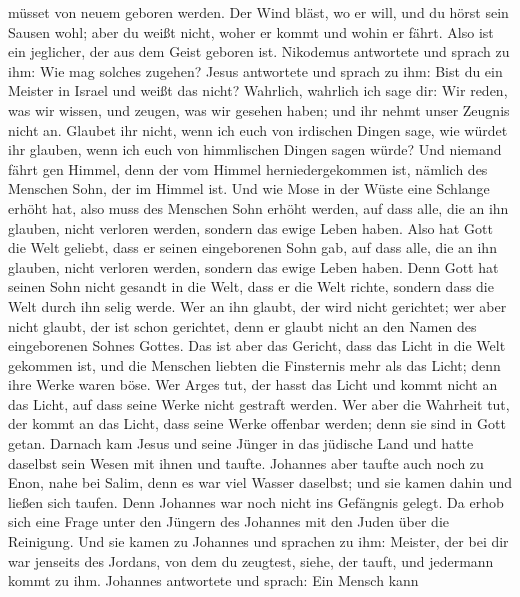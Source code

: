 müsset von neuem geboren werden.  Der Wind bläst, wo er
will, und du hörst sein Sausen wohl; aber du weißt nicht, woher er kommt
und wohin er fährt. Also ist ein jeglicher, der aus dem Geist geboren
ist.  Nikodemus antwortete und sprach zu ihm: Wie mag
solches zugehen?  Jesus antwortete und sprach zu ihm: Bist
du ein Meister in Israel und weißt das nicht?  Wahrlich,
wahrlich ich sage dir: Wir reden, was wir wissen, und zeugen, was wir
gesehen haben; und ihr nehmt unser Zeugnis nicht an. 
Glaubet ihr nicht, wenn ich euch von irdischen Dingen sage, wie würdet
ihr glauben, wenn ich euch von himmlischen Dingen sagen würde?
 Und niemand fährt gen Himmel, denn der vom Himmel
herniedergekommen ist, nämlich des Menschen Sohn, der im Himmel ist.
 Und wie Mose in der Wüste eine Schlange erhöht hat, also
muss des Menschen Sohn erhöht werden,  auf dass alle, die
an ihn glauben, nicht verloren werden, sondern das ewige Leben haben.
 Also hat Gott die Welt geliebt, dass er seinen
eingeborenen Sohn gab, auf dass alle, die an ihn glauben, nicht verloren
werden, sondern das ewige Leben haben.  Denn Gott hat
seinen Sohn nicht gesandt in die Welt, dass er die Welt richte, sondern
dass die Welt durch ihn selig werde.  Wer an ihn glaubt,
der wird nicht gerichtet; wer aber nicht glaubt, der ist schon
gerichtet, denn er glaubt nicht an den Namen des eingeborenen Sohnes
Gottes.  Das ist aber das Gericht, dass das Licht in die
Welt gekommen ist, und die Menschen liebten die Finsternis mehr als das
Licht; denn ihre Werke waren böse.  Wer Arges tut, der
hasst das Licht und kommt nicht an das Licht, auf dass seine Werke nicht
gestraft werden.  Wer aber die Wahrheit tut, der kommt an
das Licht, dass seine Werke offenbar werden; denn sie sind in Gott
getan.  Darnach kam Jesus und seine Jünger in das jüdische
Land und hatte daselbst sein Wesen mit ihnen und taufte. 
Johannes aber taufte auch noch zu Enon, nahe bei Salim, denn es war viel
Wasser daselbst; und sie kamen dahin und ließen sich taufen.
 Denn Johannes war noch nicht ins Gefängnis gelegt.
 Da erhob sich eine Frage unter den Jüngern des Johannes
mit den Juden über die Reinigung.  Und sie kamen zu
Johannes und sprachen zu ihm: Meister, der bei dir war jenseits des
Jordans, von dem du zeugtest, siehe, der tauft, und jedermann kommt zu
ihm.  Johannes antwortete und sprach: Ein Mensch kann
